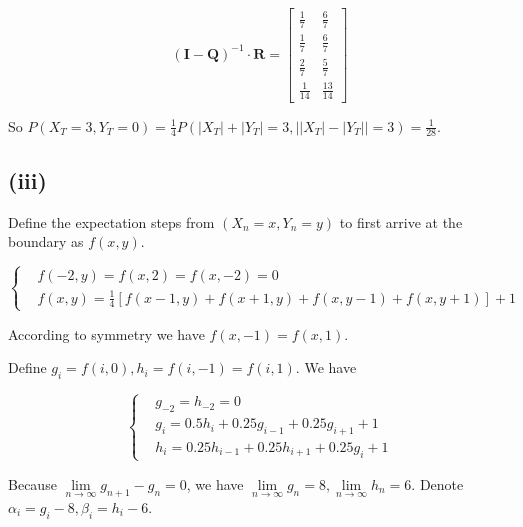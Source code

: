 \documentclass{article}
\begin{document}
\begin{equation}
    (\boldsymbol{I}-\boldsymbol{Q})^{-1}\cdot \boldsymbol{R} = \begin{bmatrix}
        \frac{1}{7} & \frac{6}{7} \\
        \frac{1}{7} & \frac{6}{7} \\
        \frac{2}{7} & \frac{5}{7} \\
        \frac{1}{14} & \frac{13}{14} 
    \end{bmatrix}
\end{equation}

So $P(X_T=3,Y_T=0) = \frac{1}{4} P(|X_T|+|Y_T| = 3, \big| |X_T|-|Y_T|\big|=3) = \frac{1}{28}$.


\subsection{(iii)}
Define the expectation steps from $(X_n = x,Y_n= y)$ to first arrive at the boundary as $f(x,y)$.

\begin{equation}
    \left\{
        \begin{aligned}
            &f(-2,y) = f(x,2) = f(x,-2) = 0\\
            &f(x,y) = \frac{1}{4}[f(x-1,y)+f(x+1,y)+f(x,y-1)+f(x,y+1)] +1 
        \end{aligned}
    \right.
\end{equation}

According to symmetry we have $f(x,-1) = f(x,1)$.


Define $g_i=f(i,0),h_i = f(i,-1)= f(i,1)$. We have

\begin{equation}
    \left\{
        \begin{aligned}
            &g_{-2} = h_{-2} = 0 \\
            & g_{i} = 0.5 h_{i} + 0.25 g_{i-1} + 0.25 g_{i+1} + 1 \\
            & h_{i} =  0.25 h_{i-1}+0.25 h_{i+1} + 0.25 g_{i} + 1 %
        \end{aligned}
    \right.
\end{equation}

Because $\lim\limits_{n\to \infty} g_{n+1}-g_{n} = 0$, we have $\lim\limits_{n\to \infty} g_{n} = 8, \lim\limits_{n\to \infty} h_n = 6$. Denote $\alpha_i = g_i - 8,\beta_i = h_i - 6$. 
\end{document}
